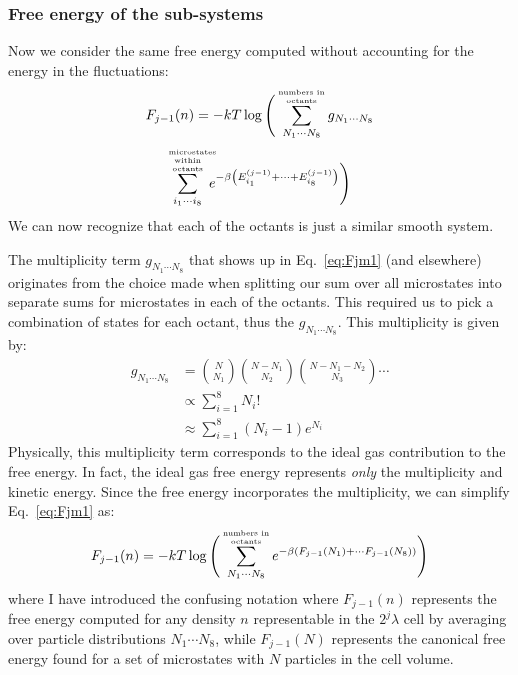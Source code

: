 \documentclass[letterpaper,twocolumn,amsmath,amssymb,pre,aps,10pt]{revtex4-1}
\begin{document}
\subsubsection{Free energy of the sub-systems}

Now we consider the same free energy computed without accounting for
the energy in the fluctuations:
\begin{multline}
  F_{j-1}(n) = -kT\log\Bigg(
    \sumoccupanciesofoctants
       g_{N_1\cdots N_8}
       \\
       \summicrostatesofoctants
       e^{-\beta \left(E_{i_1}^{(j-1)} + \cdots + E_{i_8}^{(j-1)}\right)}
  \Bigg)\label{eq:Fjm1}
\end{multline}
We can now recognize that each of the octants is just a similar smooth
system.

The multiplicity term $g_{N_1\cdots N_8}$ that shows up in
Eq.~\ref{eq:Fjm1} (and elsewhere) originates from the choice made when
splitting our sum over all microstates into separate sums for
microstates in each of the octants.  This required us to pick a
combination of states for each octant, thus the $g_{N_1\cdots N_8}$.
This multiplicity is given by:
\begin{align}
  g_{N_1\cdots N_8} &=
  {N \choose N_1} {N - N_1 \choose N_2} {N - N_1 - N_2 \choose N_3}
  \cdots \\
  &\propto \sum_{i=1}^{8} N_i!
  \\
  &\approx \sum_{i=1}^{8} (N_i-1) e^{N_i}
\end{align}
Physically, this multiplicity term corresponds to the ideal gas
contribution to the free energy.  In fact, the ideal gas free energy
represents \emph{only} the multiplicity and kinetic energy.  Since the
free energy incorporates the multiplicity, we can simplify
Eq.~\ref{eq:Fjm1} as:
\begin{multline}
  F_{j-1}(n) = -kT\log\Bigg(
    \sumoccupanciesofoctants
       e^{-\beta \left( F_{j-1}(N_1) + \cdots F_{j-1}(N_8) \right)}
  \Bigg)
\end{multline}
where I have introduced the confusing notation where $F_{j-1}(n)$
represents the free energy computed for any density $n$ representable
in the $2^j\lambda$ cell by averaging over particle distributions
$N_1\cdots N_8$, while $F_{j-1}(N)$ represents the canonical free
energy found for a set of microstates with $N$ particles in the cell
volume.
\end{document}
